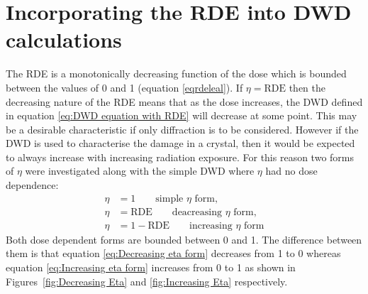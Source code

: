 \section{Incorporating the RDE into DWD calculations}
\label{sec:Incorporating the RDE into DWD Calculations}
The RDE is a monotonically decreasing function of the dose which is bounded between the values of 0 and 1 (equation \ref{eqrdeleal}).
If $\eta = \text{RDE}$ then the decreasing nature of the RDE means that as the dose increases, the DWD defined in equation \ref{eq:DWD equation with RDE} will decrease at some point.
This may be a desirable characteristic if only diffraction is to be considered.
However if the DWD is used to characterise the damage in a crystal, then it would be expected to always increase with increasing radiation exposure.
For this reason two forms of $\eta$ were investigated along with the simple DWD where $\eta$ had no dose dependence:
\begin{align}
    \eta &= 1 \qquad \text{simple $\eta$ form}, \label{eq:Simple eta form} \\
    \eta &= \text{RDE} \qquad \text{deacreasing $\eta$ form}, \label{eq:Decreasing eta form} \\
    \eta &= 1 - \text{RDE} \qquad \text{increasing $\eta$ form} \label{eq:Increasing eta form}
\end{align}
Both dose dependent forms are bounded between 0 and 1.
The difference between them is that equation \ref{eq:Decreasing eta form} decreases from 1 to 0 whereas equation \ref{eq:Increasing eta form} increases from 0 to 1 as shown in Figures~\ref{fig:Decreasing Eta} and \ref{fig:Increasing Eta} respectively.
